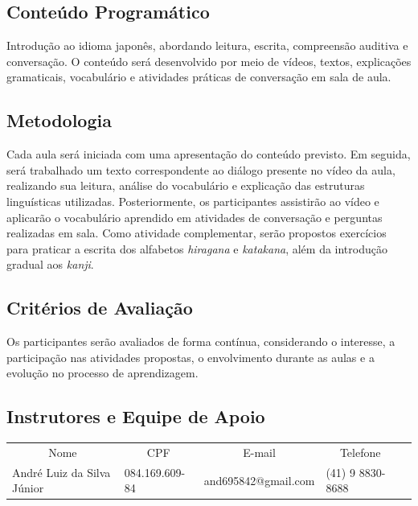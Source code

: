 \documentclass[12pt,a4paper]{article}
\begin{document}
\subsection*{Conteúdo Programático}

Introdução ao idioma japonês, abordando leitura, escrita, compreensão auditiva e conversação. O conteúdo será desenvolvido por meio de vídeos, textos, explicações gramaticais, vocabulário e atividades práticas de conversação em sala de aula.

\subsection*{Metodologia}

Cada aula será iniciada com uma apresentação do conteúdo previsto. Em seguida, será trabalhado um texto correspondente ao diálogo presente no vídeo da aula, realizando sua leitura, análise do vocabulário e explicação das estruturas linguísticas utilizadas. Posteriormente, os participantes assistirão ao vídeo e aplicarão o vocabulário aprendido em atividades de conversação e perguntas realizadas em sala. Como atividade complementar, serão propostos exercícios para praticar a escrita dos alfabetos \textit{hiragana} e \textit{katakana}, além da introdução gradual aos \textit{kanji}.

\subsection*{Critérios de Avaliação}

Os participantes serão avaliados de forma contínua, considerando o interesse, a participação nas atividades propostas, o envolvimento durante as aulas e a evolução no processo de aprendizagem.

\subsection*{Instrutores e Equipe de Apoio}

\begin{table}[H]
\begin{tabular}{lllll}
\multicolumn{1}{c}{\cellcolor[HTML]{E0E0E0}Nome} & \multicolumn{1}{c}{\cellcolor[HTML]{E0E0E0}CPF} & \multicolumn{1}{c}{\cellcolor[HTML]{E0E0E0}E-mail} & \multicolumn{1}{c}{\cellcolor[HTML]{E0E0E0}Telefone} &  \\
André Luiz da Silva Júnior                       & 084.169.609-84                                  & and695842@gmail.com                                & (41) 9 8830-8688                                     &  \\
\end{tabular}
\end{table}
\end{document}
